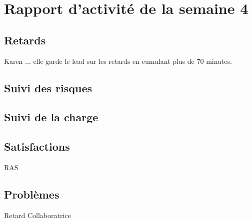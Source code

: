\section{Rapport d'activité de la semaine 4}

\subsection{Retards}

Karen ... elle garde le lead sur les retards en cumulant plus de 70 minutes.

\subsection{Suivi des risques}

\subsection{Suivi de la charge}



\subsection{Satisfactions}

RAS

\subsection{Problèmes}

Retard
Collaboratrice
